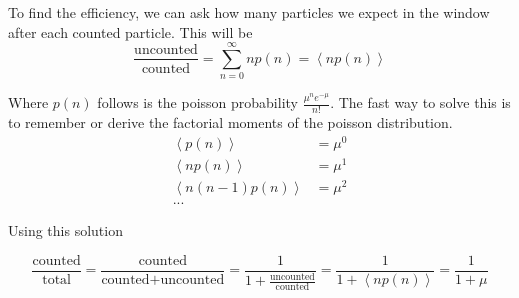 To find the efficiency, we can ask how many particles we expect in the
window after each counted particle. This will be
$$
\frac{\text{uncounted}}{\text{counted}} = \sum_{n=0}^{\infty} np\left(n\right) =
\left<np\left(n\right)\right>
$$

Where $p(n)$ follows is the poisson probability
$\frac{\mu^ne^{-\mu}}{n!}$. The fast way to solve this is to remember
or derive the factorial moments of the poisson
distribution.
\begin{align*}
\left<p\left(n\right)\right> &= \mu^0 \\
\left<np\left(n\right)\right> &= \mu^1 \\
\left<n(n-1)p\left(n\right)\right> &= \mu^2 \\
\text{...}
\end{align*}

Using this solution

$$
\frac{\text{counted}}{\text{total}} =
\frac{\text{counted}}{\text{counted} + \text{uncounted}} = \frac{1}{1
  + \frac{\text{uncounted}}{\text{counted}}} = \frac{1}{1 +
  \left<np\left(n\right)\right>} = \frac{1}{1 + \mu}
$$

